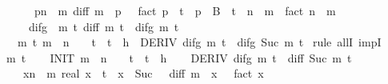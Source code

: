 \begin{isabellebody}
\ \ \ \ \ \ {\isacharparenleft}{\kern0pt}{\isacharparenleft}{\kern0pt}{\isasymSum}p{\isacharless}{\kern0pt}n\ {\isacharminus}{\kern0pt}\ m{\isachardot}{\kern0pt}\ diff\ {\isacharparenleft}{\kern0pt}m\ {\isacharplus}{\kern0pt}\ p{\isacharparenright}{\kern0pt}\ {}\ {\isacharslash}{\kern0pt}\ fact\ p\ {\isacharasterisk}{\kern0pt}\ t\ {\isacharcircum}{\kern0pt}\ p{\isacharparenright}{\kern0pt}\ {\isacharplus}{\kern0pt}\ B\ {\isacharasterisk}{\kern0pt}\ {\isacharparenleft}{\kern0pt}t\ {\isacharcircum}{\kern0pt}\ {\isacharparenleft}{\kern0pt}n\ {\isacharminus}{\kern0pt}\ m{\isacharparenright}{\kern0pt}\ {\isacharslash}{\kern0pt}\ fact\ {\isacharparenleft}{\kern0pt}n\ {\isacharminus}{\kern0pt}\ m{\isacharparenright}{\kern0pt}{\isacharparenright}{\kern0pt}{\isacharparenright}{\kern0pt}{\isacharparenright}{\kern0pt}{\isachardoublequoteclose}\isanewline
\ \ \ \ {\isacharparenleft}{\kern0pt}\ {\isachardoublequoteopen}difg\ {\isasymequiv}\ {\isacharparenleft}{\kern0pt}{\isasymlambda}m\ t{\isachardot}{\kern0pt}\ diff\ m\ t\ {\isacharminus}{\kern0pt}\ {\isacharquery}{\kern0pt}difg\ m\ t{\isacharparenright}{\kern0pt}{\isachardoublequoteclose}{\isacharparenright}{\kern0pt}\isanewline
\ \ \ {\isachardoublequoteopen}{\isasymforall}m\ t{\isachardot}{\kern0pt}\ m\ {\isacharless}{\kern0pt}\ n\ {\isasymand}\ {}\ {\isasymle}\ t\ {\isasymand}\ t\ {\isasymle}\ h\ {\isasymlongrightarrow}\ DERIV\ {\isacharparenleft}{\kern0pt}difg\ m{\isacharparenright}{\kern0pt}\ t\ {\isacharcolon}{\kern0pt}{\isachargreater}{\kern0pt}\ difg\ {\isacharparenleft}{\kern0pt}Suc\ m{\isacharparenright}{\kern0pt}\ t{\isachardoublequoteclose}\isanewline
%
\isadelimproof
%
\endisadelimproof
%
\isatagproof
{}\isamarkupfalse%
\ {\isacharparenleft}{\kern0pt}rule\ allI\ impI{\isacharparenright}{\kern0pt}{\isacharplus}{\kern0pt}\isanewline
\ \ \isamarkupfalse%
\ m\ t\isanewline
\ \ \isamarkupfalse%
\ INIT{}{\isacharcolon}{\kern0pt}\ {\isachardoublequoteopen}m\ {\isacharless}{\kern0pt}\ n\ {\isasymand}\ {}\ {\isasymle}\ t\ {\isasymand}\ t\ {\isasymle}\ h{\isachardoublequoteclose}\isanewline
\ \ \isamarkupfalse%
\ {\isachardoublequoteopen}DERIV\ {\isacharparenleft}{\kern0pt}difg\ m{\isacharparenright}{\kern0pt}\ t\ {\isacharcolon}{\kern0pt}{\isachargreater}{\kern0pt}\ diff\ {\isacharparenleft}{\kern0pt}Suc\ m{\isacharparenright}{\kern0pt}\ t\ {\isacharminus}{\kern0pt}\isanewline
\ \ \ \ {\isacharparenleft}{\kern0pt}{\isacharparenleft}{\kern0pt}{\isasymSum}x{\isacharless}{\kern0pt}n\ {\isacharminus}{\kern0pt}\ m{\isachardot}{\kern0pt}\ real\ x\ {\isacharasterisk}{\kern0pt}\ t\ {\isacharcircum}{\kern0pt}\ {\isacharparenleft}{\kern0pt}x\ {\isacharminus}{\kern0pt}\ Suc\ {}{\isacharparenright}{\kern0pt}\ {\isacharasterisk}{\kern0pt}\ diff\ {\isacharparenleft}{\kern0pt}m\ {\isacharplus}{\kern0pt}\ x{\isacharparenright}{\kern0pt}\ {}\ {\isacharslash}{\kern0pt}\ fact\ x{\isacharparenright}{\kern0pt}\ {\isacharplus}{\kern0pt}\isanewline

\end{isabellebody}
